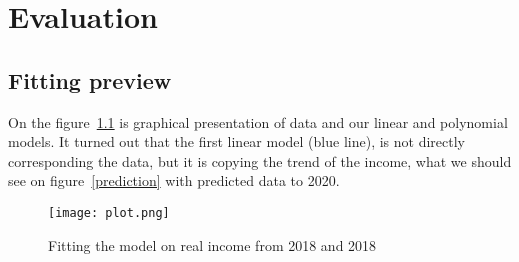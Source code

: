 
\chapter{Evaluation}
\label{evaluation}
\section{Fitting preview}
On the figure~\ref{plot} is graphical presentation of data and our linear and polynomial models.
It turned out that the first linear model (blue line), is not directly corresponding the data, but it is copying the trend of the income,
what we should see on figure~\ref{prediction} with predicted data to 2020.
\begin{figure}[h!]
    \begin{center}
        \texttt{[image: plot.png]}
    \end{center}
    \caption{Fitting the model on real income from 2018 and 2018}
    \label{plot}
\end{figure}\\
\newpage
